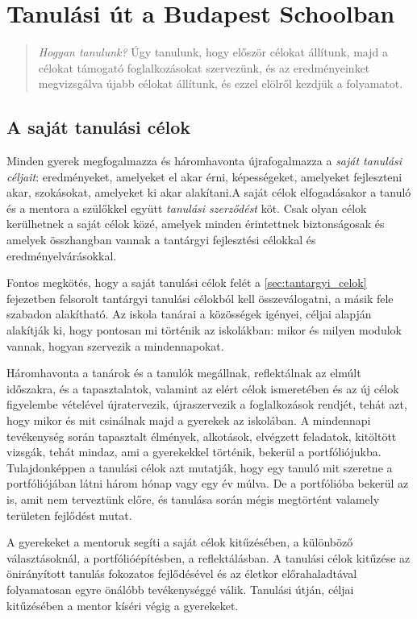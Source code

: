 \chapter{Tanulási út a Budapest Schoolban}

\begin{quote}
\emph{Hogyan tanulunk?}
Úgy tanulunk, hogy először célokat állítunk, majd a célokat támogató
foglalkozásokat szervezünk, és az eredményeinket megvizsgálva újabb
célokat állítunk, és ezzel elölről kezdjük a folyamatot.
\end{quote}

\section{A saját tanulási célok}

Minden gyerek megfogalmazza és háromhavonta újrafogalmazza a \emph{saját tanulási céljait}: eredményeket, amelyeket el akar érni, képességeket, amelyeket fejleszteni akar, szokásokat, amelyeket ki akar alakítani.A saját célok elfogadásakor a tanuló és a mentora a szülőkkel együtt \emph{tanulási szerződést} köt. Csak olyan célok kerülhetnek a saját célok közé, amelyek minden érintettnek biztonságosak és amelyek összhangban vannak a tantárgyi fejlesztési célokkal és eredményelvárásokkal.

Fontos megkötés, hogy a saját tanulási célok felét a \ref{sec:tantargyi_celok} fejezetben felsorolt tantárgyi tanulási célokból kell összeválogatni, a másik fele szabadon alakítható. Az iskola tanárai a közösségek igényei, céljai alapján alakítják ki, hogy pontosan mi történik az iskolákban: mikor és milyen modulok vannak, hogyan szervezik a mindennapokat.

Háromhavonta a tanárok és a tanulók megállnak, reflektálnak az elmúlt időszakra, és a tapasztalatok, valamint az elért célok ismeretében és az új célok figyelembe vételével újratervezik, újraszervezik a foglalkozások rendjét, tehát azt, hogy mikor és mit csinálnak majd a gyerekek az iskolában.
A mindennapi tevékenység során tapasztalt élmények, alkotások, elvégzett feladatok, kitöltött vizsgák, tehát mindaz, ami a gyerekekkel történik, bekerül a portfóliójukba. Tulajdonképpen a tanulási célok azt mutatják, hogy egy tanuló mit szeretne a portfóliójában látni három hónap vagy egy év múlva. De a portfólióba bekerül az is, amit nem terveztünk előre, és tanulása során mégis megtörtént valamely területen fejlődést mutat.

A gyerekeket a mentoruk segíti a saját célok kitűzésében, a különböző választásoknál, a portfólióépítésben, a reflektálásban. A tanulási célok kitűzése az önirányított tanulás fokozatos fejlődésével és az életkor előrahaladtával folyamatosan egyre önálóbb tevékenységgé válik. Tanulási  útján, céljai kitűzésében a mentor kíséri végig a gyerekeket.


